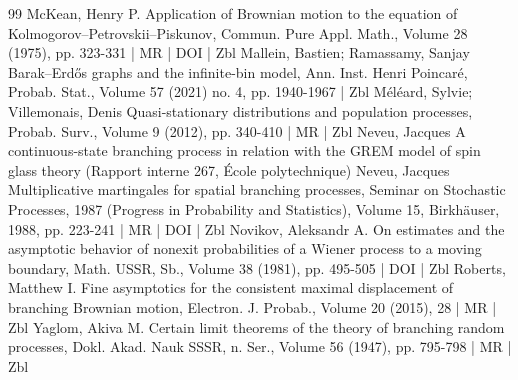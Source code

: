 \begin{thebibliography}{99}
McKean, Henry P. Application of Brownian motion to the equation of Kolmogorov–Petrovskii–Piskunov, Commun. Pure Appl. Math., Volume 28 (1975), pp. 323-331 | MR | DOI | Zbl
Mallein, Bastien; Ramassamy, Sanjay Barak–Erdős graphs and the infinite-bin model, Ann. Inst. Henri Poincaré, Probab. Stat., Volume 57 (2021) no. 4, pp. 1940-1967 | Zbl
Méléard, Sylvie; Villemonais, Denis Quasi-stationary distributions and population processes, Probab. Surv., Volume 9 (2012), pp. 340-410 | MR | Zbl
Neveu, Jacques A continuous-state branching process in relation with the GREM model of spin glass theory (Rapport interne 267, École polytechnique)
Neveu, Jacques Multiplicative martingales for spatial branching processes, Seminar on Stochastic Processes, 1987 (Progress in Probability and Statistics), Volume 15, Birkhäuser, 1988, pp. 223-241 | MR | DOI | Zbl
Novikov, Aleksandr A. On estimates and the asymptotic behavior of nonexit probabilities of a Wiener process to a moving boundary, Math. USSR, Sb., Volume 38 (1981), pp. 495-505 | DOI | Zbl
Roberts, Matthew I. Fine asymptotics for the consistent maximal displacement of branching Brownian motion, Electron. J. Probab., Volume 20 (2015), 28 | MR | Zbl
Yaglom, Akiva M. Certain limit theorems of the theory of branching random processes, Dokl. Akad. Nauk SSSR, n. Ser., Volume 56 (1947), pp. 795-798 | MR | Zbl
\end{thebibliography}
